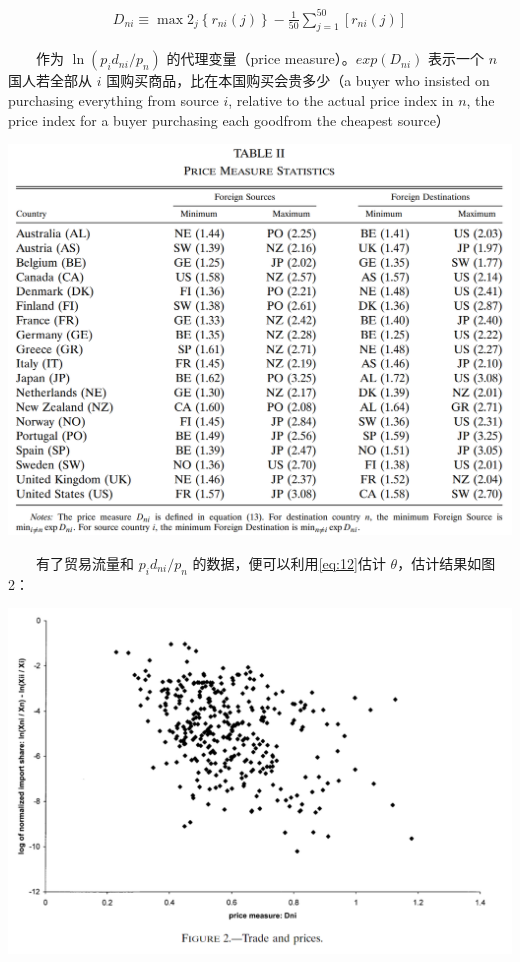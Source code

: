 \documentclass[]{article}
\begin{document}
\begin{align}
D_{n i} \equiv \max 2_{j}\left\{r_{n i}(j)\right\}-\frac{1}{50}\sum_{j=1}^{50}\left[r_{n i}(j)\right] \label{eq:13}
\end{align}

　　作为 \(\ln ({p_{i} d_{n i}}/{p_{n}})\) 的代理变量（price measure）。\(exp(D_{n i})\) 表示一个 \(n\) 国人若全部从 \(i\) 国购买商品，比在本国购买会贵多少（a buyer who insisted on purchasing everything from source \(i\), relative to the actual price index in \(n\), the price index for a buyer purchasing each goodfrom the cheapest source）

\begin{center}\includegraphics[width=0.8\linewidth]{Figures/Table2} \end{center}

　　有了贸易流量和 \({p_{i} d_{n i}}/{p_{n}}\) 的数据，便可以利用\eqref{eq:12}估计 \(\theta\)，估计结果如图2：

\begin{center}\includegraphics[width=0.8\linewidth]{Figures/Figure2} \end{center}
\end{document}
